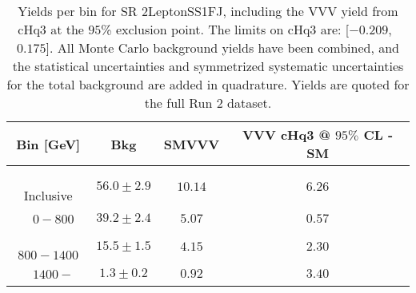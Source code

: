 \begin{table}[!htbp]
    \small
    \center
    \begin{tabular}{c||c|c|c}
    Bin [GeV] & Bkg & SMVVV & \pbox{20cm}{VVV \\ cHq3 @ $95\%$ CL - SM \\ }\\
    \hline
    \pbox{20cm}{ ~ \\Inclusive\\ } & $56.0 \pm 2.9$ & $10.14$ & $6.26$\\
    \hline
    \pbox{20cm}{ ~ \\$0-800$\\ } & $39.2 \pm 2.4$ & $5.07$ & $0.57$\\
    \hline
    \pbox{20cm}{ ~ \\$800-1400$\\ } & $15.5 \pm 1.5$ & $4.15$ & $2.30$\\
    \hline
    \pbox{20cm}{ ~ \\$1400-$\\ } & $1.3 \pm 0.2$ & $0.92$ & $3.40$\\
\end{tabular}
    \caption{Yields per bin for SR 2LeptonSS1FJ, including the VVV yield from cHq3 at the $95$\% exclusion point. The limits on cHq3 are: [$-0.209$,~$0.175$]. All Monte Carlo background yields have been combined, and the statistical uncertainties and symmetrized systematic uncertainties for the total background are added in quadrature. Yields are quoted for the full Run 2 dataset.}
    \label{tab:2LeptonSS1FJ$binssignal}
\end{table}
